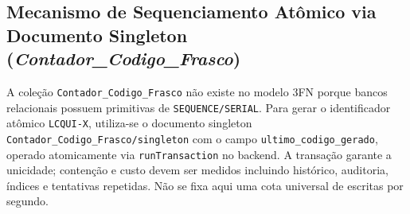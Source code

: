\subsection{Mecanismo de Sequenciamento Atômico via Documento Singleton (\textit{Contador\_Codigo\_Frasco})}
A coleção \texttt{Contador\_Codigo\_Frasco} não existe no modelo 3FN porque bancos relacionais possuem primitivas de \texttt{SEQUENCE/SERIAL}. Para gerar o identificador atômico \texttt{LCQUI-X}, utiliza-se o documento singleton \texttt{Contador\_Codigo\_Frasco/singleton} com o campo \texttt{ultimo\_codigo\_gerado}, operado atomicamente via \texttt{runTransaction} no backend. A transação garante a unicidade; contenção e custo devem ser medidos incluindo histórico, auditoria, índices e tentativas repetidas. Não se fixa aqui uma cota universal de escritas por segundo.

